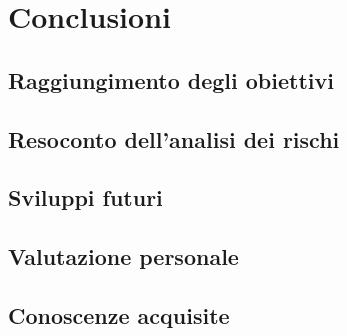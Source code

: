 
\pagestyle{IHA-fancy-style}
\chapter{Conclusioni}
\label{cap:conclusioni}

\section{Raggiungimento degli obiettivi}

\section{Resoconto dell'analisi dei rischi}

\section{Sviluppi futuri}

\section{Valutazione personale}

\section{Conoscenze acquisite}
